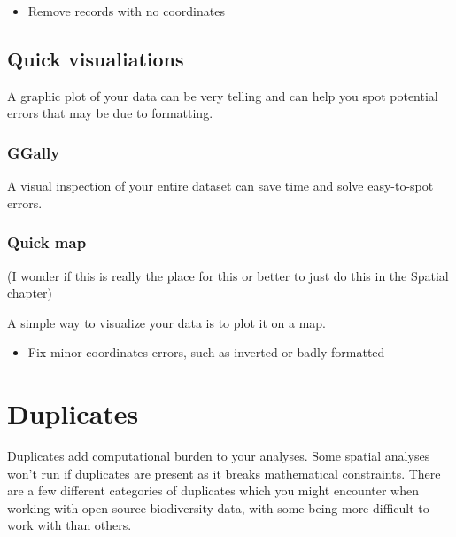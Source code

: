 \documentclass[
  letterpaper,
  DIV=11,
  numbers=noendperiod,
  oneside]{scrreprt}
\providecommand{\tightlist}{%
  \setlength{\itemsep}{0pt}\setlength{\parskip}{0pt}}\usepackage{longtable,booktabs,array}
\begin{document}
\begin{itemize}
\tightlist
\item
  Remove records with no coordinates
\end{itemize}

\hypertarget{quick-visualiations}{%
\section{Quick visualiations}\label{quick-visualiations}}

A graphic plot of your data can be very telling and can help you spot
potential errors that may be due to formatting.

\hypertarget{ggally}{%
\subsection{GGally}\label{ggally}}

A visual inspection of your entire dataset can save time and solve
easy-to-spot errors.

\hypertarget{quick-map}{%
\subsection{Quick map}\label{quick-map}}

(I wonder if this is really the place for this or better to just do this
in the Spatial chapter)

A simple way to visualize your data is to plot it on a map.

\begin{itemize}
\tightlist
\item
  Fix minor coordinates errors, such as inverted or badly formatted
\end{itemize}

\hypertarget{section}{%
\subsection{}\label{section}}


\hypertarget{duplicates}{%
\chapter{Duplicates}\label{duplicates}}

Duplicates add computational burden to your analyses. Some spatial
analyses won't run if duplicates are present as it breaks mathematical
constraints. There are a few different categories of duplicates which
you might encounter when working with open source biodiversity data,
with some being more difficult to work with than others.
\end{document}
